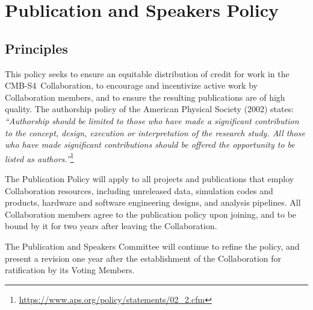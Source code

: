 \documentclass[12pt]{article}
\newcommand\collabname{CMB-S4}
\begin{document}


%


%

\section{Publication and Speakers Policy}
\label{sec:pub}
\subsection{Principles}
This policy seeks to ensure an equitable distribution of credit for work in the \collabname\ Collaboration, to encourage and incentivize active work by Collaboration members, and to ensure the resulting publications are of high quality. The authorship policy of the American Physical Society (2002) states: \textit{``Authorship should be limited to those who have made a significant contribution to the concept, design, execution or interpretation of the research study. All those who have made significant contributions should be offered the opportunity to be listed as authors.''}\footnote{\url{https://www.aps.org/policy/statements/02_2.cfm}}

The Publication Policy will apply to all projects and publications that employ Collaboration resources, including unreleased data, simulation codes and products, hardware and software
engineering designs, and analysis pipelines. All Collaboration members agree to the publication policy upon joining, and to be bound by it for two years after leaving the Collaboration.

{\color{\markcolor} 
The Publication and Speakers Committee will continue to refine the policy, and present a revision one year after the establishment of the Collaboration for ratification by its Voting Members.
}
\end{document}
